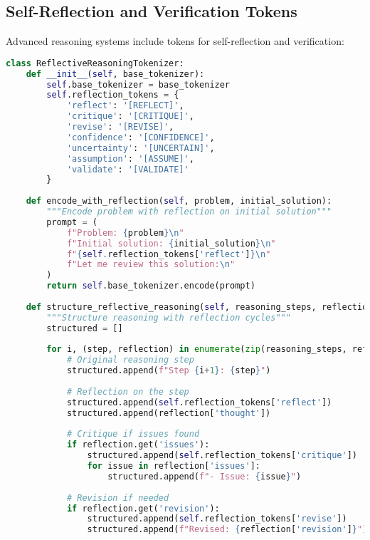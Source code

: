 \subsection{Self-Reflection and Verification Tokens}

Advanced reasoning systems include tokens for self-reflection and verification:

\begin{lstlisting}[language=Python, caption=Self-reflection and verification tokens]
class ReflectiveReasoningTokenizer:
    def __init__(self, base_tokenizer):
        self.base_tokenizer = base_tokenizer
        self.reflection_tokens = {
            'reflect': '[REFLECT]',
            'critique': '[CRITIQUE]',
            'revise': '[REVISE]',
            'confidence': '[CONFIDENCE]',
            'uncertainty': '[UNCERTAIN]',
            'assumption': '[ASSUME]',
            'validate': '[VALIDATE]'
        }
        
    def encode_with_reflection(self, problem, initial_solution):
        """Encode problem with reflection on initial solution"""
        prompt = (
            f"Problem: {problem}\n"
            f"Initial solution: {initial_solution}\n"
            f"{self.reflection_tokens['reflect']}\n"
            f"Let me review this solution:\n"
        )
        return self.base_tokenizer.encode(prompt)
    
    def structure_reflective_reasoning(self, reasoning_steps, reflections):
        """Structure reasoning with reflection cycles"""
        structured = []
        
        for i, (step, reflection) in enumerate(zip(reasoning_steps, reflections)):
            # Original reasoning step
            structured.append(f"Step {i+1}: {step}")
            
            # Reflection on the step
            structured.append(self.reflection_tokens['reflect'])
            structured.append(reflection['thought'])
            
            # Critique if issues found
            if reflection.get('issues'):
                structured.append(self.reflection_tokens['critique'])
                for issue in reflection['issues']:
                    structured.append(f"- Issue: {issue}")
            
            # Revision if needed
            if reflection.get('revision'):
                structured.append(self.reflection_tokens['revise'])
                structured.append(f"Revised: {reflection['revision']}")
            

\end{lstlisting}
